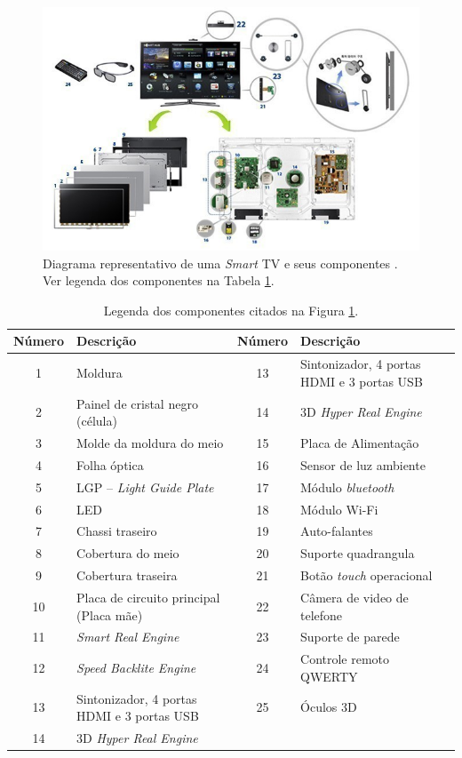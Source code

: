 \begin{figure}[h!]
	\includegraphics[width=\textwidth]{img/smart_samsung.jpg}
	\caption{Diagrama representativo de uma \emph{Smart} TV e seus componentes \cite{samsung:smarttv}. Ver legenda dos componentes na Tabela \ref{tab:smart}.}
	\label{fig:smart_samsung}
\end{figure}

\begin{table}[h!]
	\centering
	\caption{Legenda dos componentes citados na Figura \ref{fig:smart_samsung}.}
	\label{tab:smart}
		\begin{footnotesize}
	\begin{tabular}{c l  c   l }
		\toprule
		\textbf{Número} & \textbf{Descrição} & \textbf{Número} & \textbf{Descrição}\\
		\midrule
		1 & Moldura & 13 & Sintonizador, 4 portas HDMI e 3 portas USB \\
		2 & Painel de cristal negro (célula) & 14 & 3D \emph{Hyper Real Engine}\\
		3 & Molde da moldura do meio & 15 & Placa de Alimentação \\
		4 & Folha óptica & 16 & Sensor de luz ambiente\\
		5 & LGP -- \emph{Light Guide Plate} & 17 &  Módulo \emph{bluetooth} \\
		6 & LED & 18 & Módulo Wi-Fi\\
		7 & Chassi traseiro & 19 & Auto-falantes \\
		8 & Cobertura do meio & 20 & Suporte quadrangula\\
		9 & Cobertura traseira & 21 & Botão \emph{touch} operacional\\
		10 & Placa de circuito principal (Placa mãe) & 22 & Câmera de video de telefone\\
		11 & \emph{Smart Real Engine} & 23 & Suporte de parede \\
		12 & \emph{Speed Backlite Engine} & 24 & Controle remoto QWERTY\\
		13 & Sintonizador, 4 portas HDMI e 3 portas USB & 25 & Óculos 3D\\
		14 & 3D \emph{Hyper Real Engine}  & &  \\
		\bottomrule
	\end{tabular}
\end{footnotesize}
\end{table}

